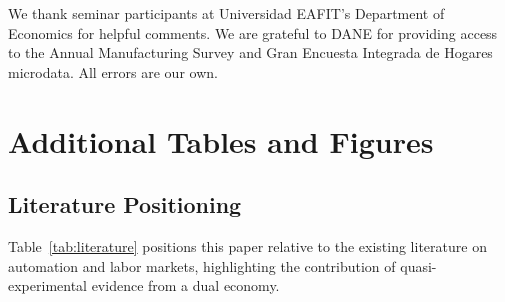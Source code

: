 \documentclass[5p,times,authoryear]{elsarticle}
\begin{document}
We thank seminar participants at Universidad EAFIT's Department of Economics for helpful comments. We are grateful to DANE for providing access to the Annual Manufacturing Survey and Gran Encuesta Integrada de Hogares microdata. All errors are our own.




\appendix

\section{Additional Tables and Figures}
\label{app:tables}

\subsection{Literature Positioning}
\label{app:literature}

Table~\ref{tab:literature} positions this paper relative to the existing literature on automation and labor markets, highlighting the contribution of quasi-experimental evidence from a dual economy.
\end{document}
